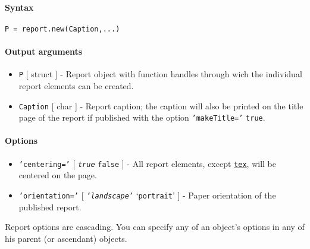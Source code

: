 


	\paragraph{Syntax}

\begin{verbatim}
P = report.new(Caption,...)
\end{verbatim}

\paragraph{Output arguments}

\begin{itemize}
\item
  \texttt{P} {[} struct {]} - Report object with function handles
  through wich the individual report elements can be created.
\item
  \texttt{Caption} {[} char {]} - Report caption; the caption will also
  be printed on the title page of the report if published with the
  option \texttt{'makeTitle='} \texttt{true}.
\end{itemize}

\paragraph{Options}

\begin{itemize}
\item
  \texttt{'centering='} {[} \emph{\texttt{true}} \textbar{}
  \texttt{false} {]} - All report elements, except
  \href{report/tex}{\texttt{tex}}, will be centered on the page.
\item
  \texttt{'orientation='} {[} \emph{\texttt{'landscape'}} \textbar{}
  `\texttt{portrait}' {]} - Paper orientation of the published report.
\end{itemize}

Report options are cascading. You can specify any of an object's options
in any of his parent (or ascendant) objects.


